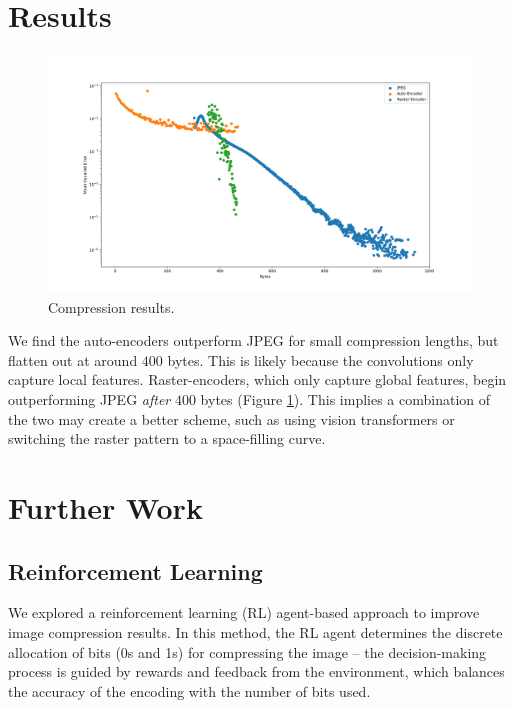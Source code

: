 \documentclass[11pt]{article}
\begin{document}
\section{Results}
\begin{figure}[h]
  \centering
  \includegraphics[width=2\columnwidth]{diagrams/results.png}
  \caption{Compression results.}
  \label{fig:results}
\end{figure}

We find the auto-encoders outperform JPEG for small compression lengths, but flatten out at around $400$ bytes. This is likely because the convolutions only capture local features. Raster-encoders, which only capture global features, begin outperforming JPEG \emph{after} $400$ bytes (Figure \ref{fig:results}). This implies a combination of the two may create a better scheme, such as using vision transformers or switching the raster pattern to a space-filling curve.

\section{Further Work}
\subsection{Reinforcement Learning}
We explored a reinforcement learning (RL) agent-based approach to improve image compression results. In this method, the RL agent determines the discrete allocation of bits (0s and 1s) for compressing the image -- the decision-making process is guided by rewards and feedback from the environment, which balances the accuracy of the encoding with the number of bits used.
\end{document}
